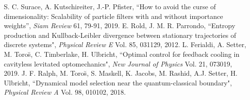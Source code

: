 \documentclass[conference]{IEEEtran}
\begin{document}
\begin{thebibliography}{1}
 S. C. Surace, A. Kutschireiter, J.-P. Pfister, ``How to avoid the curse of dimensionality: Scalability of particle filters with and without importance weights'', {\em Siam Review} 61, 79-91, 2019.
 E. Rold, J. M. R. Parrondo, ``Entropy production and Kullback-Leibler divergence between stationary trajectories of discrete systems", {\em Physical Review E} Vol. 85, 031129, 2012.
 L. Ferialdi, A. Setter, M. Toro\u{s}, C. Timberlake, H. Ulbricht, ``Optimal control for feedback cooling in cavityless levitated optomechanics", {\em New Journal of Physics} Vol. 21, 073019, 2019.
 J. F. Ralph, M. Toro\u{s}, S. Maskell, K. Jacobs, M. Rashid, A.J. Setter, H. Ulbricht, ``Dynamical model selection near the quantum-classical boundary", {\em Physical Review A} Vol. 98, 010102, 2018.

\end{thebibliography}
\end{document}

